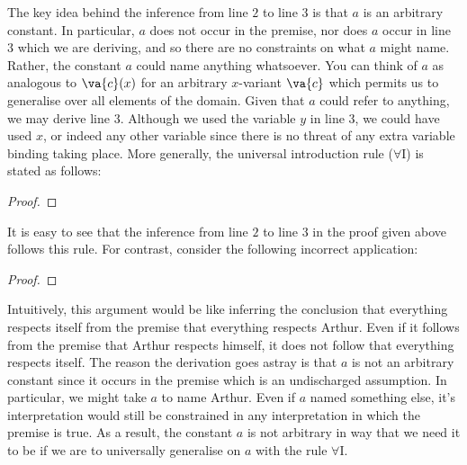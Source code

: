 The key idea behind the inference from line $2$ to line $3$ is that $a$ is an arbitrary constant. 
In particular, $a$ does not occur in the premise, nor does $a$ occur in line $3$ which we are deriving, and so there are no constraints on what $a$ might name. 
Rather, the constant $a$ could name anything whatsoever. 
You can think of $a$ as analogous to $\va{c}(x)$ for an arbitrary $x$-variant $\va{c}$ which permits us to generalise over all elements of the domain.
Given that $a$ could refer to anything, we may derive line $3$.
Although we used the variable $y$ in line $3$, we could have used $x$, or indeed any other variable since there is no threat of any extra variable binding taking place.
More generally, the universal introduction rule ($\forall$I) is stated as follows:

\begin{proof}
     
   
\end{proof}

It is easy to see that the inference from line $2$ to line $3$ in the proof given above follows this rule.
For contrast, consider the following incorrect application:

\begin{proof}
	 \pr{}
	 
   
\end{proof}

Intuitively, this argument would be like inferring the conclusion that everything respects itself from the premise that everything respects Arthur.
Even if it follows from the premise that Arthur respects himself, it does not follow that everything respects itself.
The reason the derivation goes astray is that $a$ is not an arbitrary constant since it occurs in the premise which is an undischarged assumption.
In particular, we might take $a$ to name Arthur.
Even if $a$ named something else, it's interpretation would still be constrained in any interpretation in which the premise is true.
As a result, the constant $a$ is not arbitrary in way that we need it to be if we are to universally generalise on $a$ with the rule $\forall$I. 

